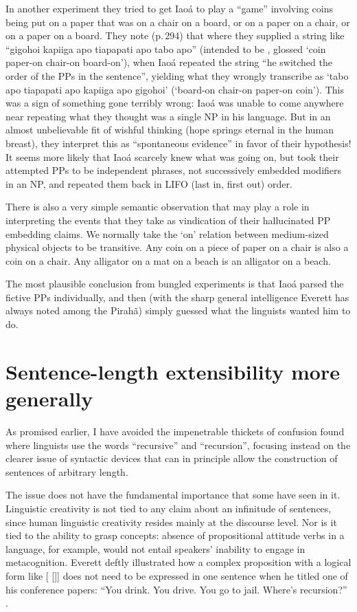 \documentclass[output=paper,colorlinks,citecolor=brown
]{langscibook}
\begin{document}
In another experiment they tried to get Iaoá to play a ``game''
involving coins being put on a paper that was on a chair on a board,
or on a paper on a chair, or on a paper on a board. They note (p.\,294)
that where they supplied a string like ``gigohoi kapiiga apo tiapapati
apo tabo apo'' (intended to be , glossed `coin paper-on chair-on board-on'),
when Iaoá repeated the string ``he switched the order of the PPs in
the sentence'', yielding what they wrongly transcribe as `tabo apo
tiapapati apo kapiiga apo gigohoi' (`board-on chair-on paper-on coin').
This was a sign of something gone terribly wrong: Iaoá was unable
to come anywhere near repeating what they thought was a single NP in
his language. But in an almost unbelievable fit of wishful thinking
(hope springs eternal in the human breast), they interpret this as
``spontaneous evidence'' in favor of their hypothesis!
It seems more likely that Iaoá scarcely knew what was going on,
but took their attempted PPs to be independent phrases, not
successively embedded modifiers in an NP, and repeated them back in
LIFO (last in, first out) order.

There is also a very simple semantic observation that may play a
role in interpreting the events that they take as vindication of their
hallucinated PP embedding claims. We normally take the `on' relation
between medium-sized physical objects to be transitive. Any coin on
a piece of paper on a chair is also a coin on a chair. Any alligator
on a mat on a beach is an alligator on a beach.

The most plausible conclusion from  bungled experiments
is that Iaoá parsed the fictive PPs individually, and then (with the
sharp general intelligence Everett has always noted among the Pirahã)
simply guessed what the linguists wanted him to do.

\section{Sentence-length extensibility more generally}

As promised earlier, I have avoided the impenetrable thickets of confusion
found where linguists use the words ``recursive'' and ``recursion'', focusing
instead on the clearer issue of syntactic devices that can in principle
allow the construction of sentences of arbitrary length.

The issue does not have the fundamental importance that some have seen
in it. Linguistic creativity is not tied to any claim about an infinitude
of sentences, since human linguistic creativity resides mainly at the
discourse level. Nor is it tied to the ability to grasp concepts:
absence of propositional attitude verbs in a language, for example,
would not entail speakers' inability to engage in metacognition.
Everett deftly illustrated how a complex proposition with a logical
form like [ []]  does not need
to be expressed in one sentence when he titled one of his conference
papers: ``You drink. You drive. You go to jail. Where's recursion?''
\citep{Everett10}.
\end{document}
